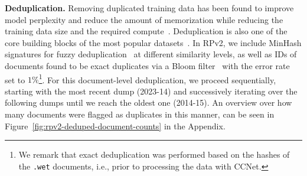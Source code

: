 \documentclass{article}
\begin{document}
{\bf Deduplication.} Removing duplicated training data has been found to improve model perplexity and reduce the amount of memorization while reducing the training data size and the required compute~\cite{lee2021deduplicating}. Deduplication is also one of the core building blocks of the most popular datasets~\cite{raffel2020exploring,soldaini2024dolma,penedo2024refinedweb}. In RPv2, we include MinHash signatures for fuzzy deduplication~\cite{broder1997resemblance} at different similarity levels, as well as IDs of documents found to be exact duplicates via a Bloom filter~\cite{bloom1970space} with the error rate set to $1\%$\footnote{We remark that exact deduplication was performed based on the hashes of the \texttt{.wet} documents, i.e., prior to processing the data with CCNet.}.
For this document-level deduplication, we proceed sequentially, starting with the most recent dump (2023-14) and successively iterating over the following dumps until we reach the oldest one (2014-15). 
An overview over how many documents were flagged as duplicates in this manner, can be seen in Figure~\ref{fig:rpv2-deduped-document-counts} in the Appendix.
\end{document}
